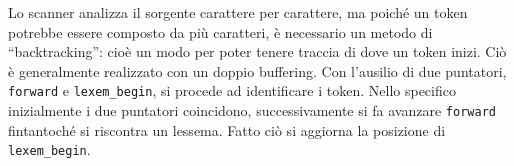 \documentclass{subfiles}
\begin{document}
Lo scanner analizza il sorgente carattere per carattere, ma poiché un token potrebbe essere composto da più caratteri,
è necessario un metodo di ``backtracking'': cioè un modo per poter tenere traccia di dove un token inizi.
Ciò è generalmente realizzato con un doppio buffering. Con l'ausilio di due puntatori, \lstinline{forward} e \lstinline{lexem_begin},
si procede ad identificare i token. Nello specifico inizialmente i due puntatori coincidono,
successivamente si fa avanzare \lstinline{forward} fintantoché si riscontra un lessema. Fatto ciò si aggiorna la posizione di \lstinline{lexem_begin}.
\end{document}
